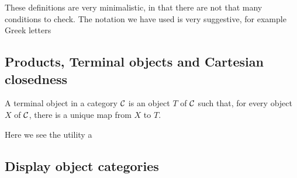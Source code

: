 \begin{defin}
    These definitions are very minimalistic, in that there are not that many conditions to check. The notation we have used is very suggestive, for example Greek letters 
\end{defin}

\subsection{Products, Terminal objects and Cartesian closedness}

\begin{defin}
    A terminal object in a category $\mathcal{C}$ is an object $T$ of $\mathcal{C}$ such that, for every object $X$ of $\mathcal{C}$, there is a unique map from $X$ to $T$.
\end{defin}

Here we see the utility a

\subsection{Display object categories}

